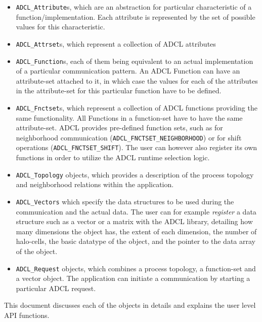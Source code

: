 \begin{itemize}
\item {\tt ADCL\_Attribute}s, which are an abstraction for particular characteristic of a function/implementation. Each attribute is represented by the set of possible values for this characteristic.
\item {\tt ADCL\_Attrset}s, which represent a collection of ADCL attributes
\item {\tt ADCL\_Function}s, each of them being equivalent to an actual implementation of a particular communication pattern. An ADCL Function can have an attribute-set attached to it, in which case the values for each of the attributes in the attribute-set for this particular function have to be defined.
\item {\tt ADCL\_Fnctset}s, which represent a collection of ADCL functions providing the same functionality. All Functions in a function-set have to have the same attribute-set. ADCL provides pre-defined function sets, such as for neighborhood communication ({\tt ADCL\_FNCTSET\_NEIGHBORHOOD}) or for shift operations ({\tt ADCL\_FNCTSET\_SHIFT}). The user can however also register its own functions in order to utilize the ADCL runtime selection logic.
\item {\tt ADCL\_Topology} objects, which provides a description of the process topology and neighborhood relations within the application.

\item {\tt ADCL\_Vectors} which specify the data structures to be used during the communication and the actual data. The user can for example {\it register} a data structure such as a vector or a matrix with the ADCL library, detailing how many dimensions the object has, the extent of each dimension, the number of halo-cells, the basic datatype of the object, and the pointer to the data array of the object.
\item {\tt ADCL\_Request} objects, which combines a process topology, a function-set and a vector object. The application can initiate a communication by starting a particular ADCL request.
\end{itemize}

This document discusses each of the objects in details and explains the user level API functions.